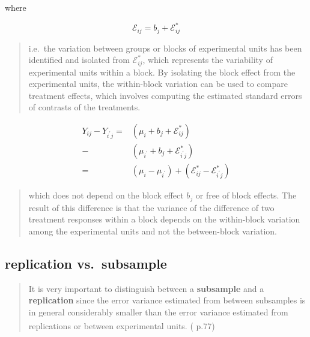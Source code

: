 \documentclass[
]{book}
\theoremstyle{definition}
\theoremstyle{definition}
\theoremstyle{definition}
\theoremstyle{definition}
\theoremstyle{remark}
\begin{document}
where

\[
\mathcal{E}_{{\scriptscriptstyle i}{\scriptscriptstyle j}}=b_{{\scriptscriptstyle j}}+\mathcal{E}_{{\scriptscriptstyle i}{\scriptscriptstyle j}}^{*}
\]

\begin{quote}
i.e.~the variation between groups or blocks of experimental units has been identified and isolated from \(\mathcal{E}_{ij}^{*}\), which represents the variability of experimental units within a block. By isolating the block effect from the experimental units, the within-block variation can be used to compare treatment effects, which involves computing the estimated standard errors of contrasts of the treatments.
\end{quote}

\[
\begin{aligned}
Y_{{\scriptscriptstyle i}{\scriptscriptstyle j}}-Y_{{\scriptscriptstyle i^{\prime}}{\scriptscriptstyle j}}= & \left(\mu_{{\scriptscriptstyle i}}+b_{{\scriptscriptstyle j}}+\mathcal{E}_{{\scriptscriptstyle i}{\scriptscriptstyle j}}^{*}\right)\\
- & \left(\mu_{{\scriptscriptstyle i^{\prime}}}+b_{{\scriptscriptstyle j}}+\mathcal{E}_{{\scriptscriptstyle i^{\prime}}{\scriptscriptstyle j}}^{*}\right)\\
= & \left(\mu_{{\scriptscriptstyle i}}-\mu_{{\scriptscriptstyle i^{\prime}}}\right)+\left(\mathcal{E}_{{\scriptscriptstyle i}{\scriptscriptstyle j}}^{*}-\mathcal{E}_{{\scriptscriptstyle i^{\prime}}{\scriptscriptstyle j}}^{*}\right)
\end{aligned}
\]

\begin{quote}
which does not depend on the block effect \(b_{j}\) or free of block effects. The result of this difference is that the variance of the difference of two treatment responses within a block depends on the within-block variation among the experimental units and not the between-block variation.
\end{quote}

\subsection{replication vs.~subsample}\label{replication-vs.-subsample}

\begin{quote}
It is very important to distinguish between a \textbf{subsample} and a \textbf{replication} since the error variance estimated from between subsamples is in general considerably smaller than the error variance estimated from replications or between experimental units. (\textsuperscript{} p.77)
\end{quote}
\end{document}

